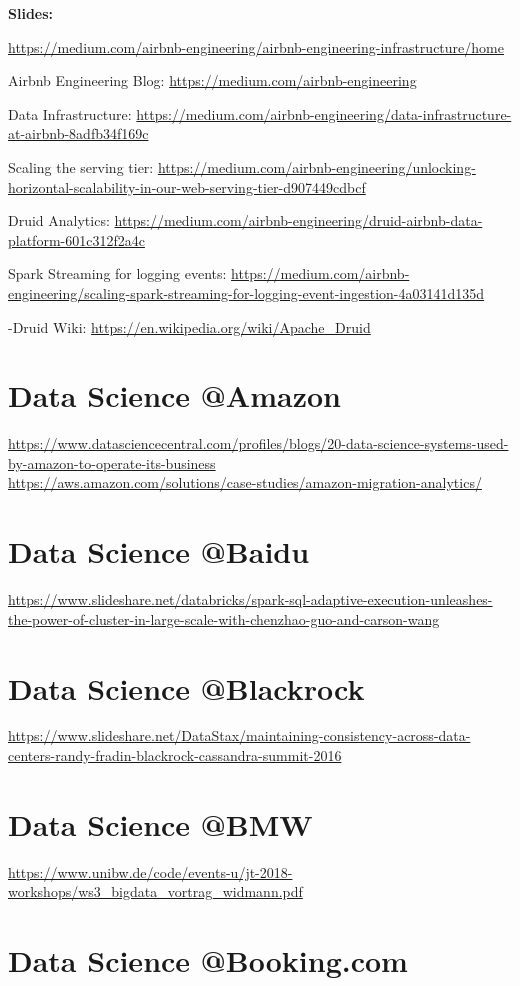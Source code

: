 \documentclass[12pt, numbers=noenddot]{scrreprt} %
\begin{document}
\textbf{Slides:}

\url{https://medium.com/airbnb-engineering/airbnb-engineering-infrastructure/home}

Airbnb Engineering Blog:
\url{https://medium.com/airbnb-engineering}

Data Infrastructure:
\url{https://medium.com/airbnb-engineering/data-infrastructure-at-airbnb-8adfb34f169c}

Scaling the serving tier:
\url{https://medium.com/airbnb-engineering/unlocking-horizontal-scalability-in-our-web-serving-tier-d907449cdbcf}

Druid Analytics:
\url{https://medium.com/airbnb-engineering/druid-airbnb-data-platform-601c312f2a4c}

Spark Streaming for logging events:
\url{https://medium.com/airbnb-engineering/scaling-spark-streaming-for-logging-event-ingestion-4a03141d135d}

-Druid Wiki:
\url{https://en.wikipedia.org/wiki/Apache_Druid}

\section{Data Science @Amazon}
\url{https://www.datasciencecentral.com/profiles/blogs/20-data-science-systems-used-by-amazon-to-operate-its-business} \\
\url{https://aws.amazon.com/solutions/case-studies/amazon-migration-analytics/}

\section{Data Science @Baidu}
\url{https://www.slideshare.net/databricks/spark-sql-adaptive-execution-unleashes-the-power-of-cluster-in-large-scale-with-chenzhao-guo-and-carson-wang}

\section{Data Science @Blackrock}
\url{https://www.slideshare.net/DataStax/maintaining-consistency-across-data-centers-randy-fradin-blackrock-cassandra-summit-2016}

\section{Data Science @BMW}
\url{https://www.unibw.de/code/events-u/jt-2018-workshops/ws3_bigdata_vortrag_widmann.pdf}

\section{Data Science @Booking.com}
\end{document}
